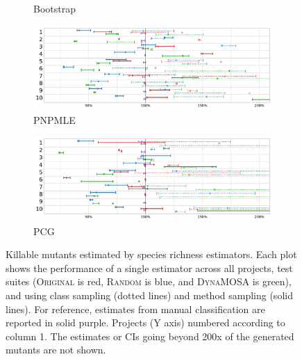 \documentclass[sigconf,review,anonymous]{acmart}
\newcommand{\Bootstrap}{Bootstrap\xspace}
\newcommand{\Pnpmle}{PNPMLE\xspace}
\newcommand{\PCG}{PCG\xspace}
\newcommand{\original}{\textsc{Original}\xspace}
\newcommand{\EvosuiteRandom}{\textsc{Random}\xspace}
\newcommand{\EvosuiteDynamosa}{\textsc{DynaMOSA}\xspace}
\begin{document}
\begin{figure}
\begin{subfigure}{.49\textwidth}
\vspace*{-3mm}
\caption{\Bootstrap}
\end{subfigure}
\begin{subfigure}{.49\textwidth}
    \centering
      \includegraphics[width=0.95\linewidth]{charts/ggplot/estimators-no-title/Pnpmle.pdf}
\vspace*{-3mm}
\caption{\Pnpmle}
\end{subfigure}
\begin{subfigure}{.49\textwidth}
    \centering
      \includegraphics[width=0.95\linewidth]{charts/ggplot/estimators-no-title/PCG.pdf}
\vspace*{-3mm}
\caption{\PCG}
\end{subfigure}
\caption{Killable mutants estimated by species richness estimators.
Each plot shows the performance of a single estimator across all projects,  
test suites (\original is red, \EvosuiteRandom is blue, and \EvosuiteDynamosa is green), and
using class sampling (dotted lines) and method sampling (solid lines).
For reference, estimates from manual classification are reported in solid purple.
Projects (Y axis) numbered according to  column 1.
The estimates or CIs going beyond 200x of the generated mutants are not shown.}
\label{fig:results}
\end{figure}


\bigskip
\end{document}
